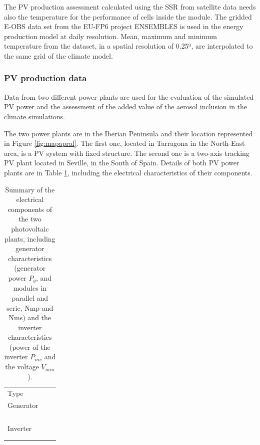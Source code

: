 The PV production assessment calculated using the SSR from satellite data needs also the temperature for the performance of cells inside the module. The gridded E-OBS data set from the EU-FP6 project ENSEMBLES \cite*{Haylock2008} is used in the energy production model at daily resolution. Mean, maximum and minimum temperature from the dataset, in a spatial resolution of 0.25º, are interpolated to the same grid of the climate model. 

\subsubsection{PV production data}

Data from two different power plants are used for the evaluation of the simulated PV power and the assessment of the added value of the aerosol inclusion in the climate simulations.

The two power plants are in the Iberian Peninsula and their location represented in Figure \ref{fig:mapapral}. The first one, located in Tarragona in the North-East area, is a PV system with fixed structure. The second one is a two-axis tracking PV plant located in Seville, in the South of Spain. Details of both PV power plants are in Table \ref{tabPlants}, including the electrical characteristics of their components. 

\begin{table}[h!]
  \begin{tabular}{>{\raggedright}m{1.5cm}>{\raggedright}m{3cm}>{\raggedright}m{3cm}}
    \toprule 
     & \centering{Seville} & \centering{Tarragona}\tabularnewline
    \midrule
    Type & \centering{two-axes} & \centering{fixed} 
\tabularnewline
    \midrule
    Generator & \centering{$P_{g}=27.31$ $\kilo\wattpeak$}\\ 
                 \centering{$N_{mp}=12$}\\
                 \centering{$N_{ms}=11$} & \centering{$P_g=100.18$ $\kilo\wattpeak$}\\
                               \centering{$N_{mp}=27$}\\
                               \centering{$N_{ms}=35$}
   \tabularnewline
   \midrule
   Inverter & \centering{$P_{inv}=25$ $\kilo\watt$}\\
              \centering{$V_{min}=405$ $\volt$} & \centering{$P_{inv}=100$ $\kilo\wattpeak$}\\
                                \centering{$V_{min}=450$ $\volt$}
    \tabularnewline    
    \bottomrule
  \end{tabular}
  \caption[Electrical components of the PV power plants]{Summary of the electrical components of the two photovoltaic plants, including generator characteristics (generator power $P_g$, and modules in parallel and serie, Nmp and Nms) and the inverter characteristics (power of the inverter $P_{inv}$ and the voltage $V_{min}$).}
  \label{tabPlants}
\end{table}


